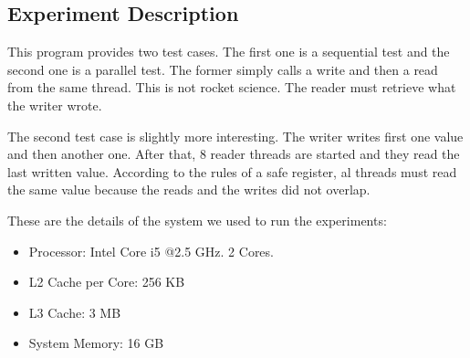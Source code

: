 \subsection{Experiment Description}
\par
This program provides two test cases. The first one is a sequential test and the
second one is a parallel test. The former simply calls a write and then a read
from the same thread. This is not rocket science. The reader must retrieve what
the writer wrote.
\par
The second test case is slightly more interesting. The writer writes first one
value and then another one. After that, 8 reader threads are started and they
read the last written value. According to the rules of a safe register, al
threads must read the same value because the reads and the writes did not
overlap.
\par
These are the details of the system we used to run the experiments:
\begin{itemize}
\item Processor: Intel Core i5 @2.5 GHz. 2 Cores.
\item L2 Cache per Core: 256 KB
\item L3 Cache: 3 MB
\item System Memory: 16 GB
\end{itemize}
